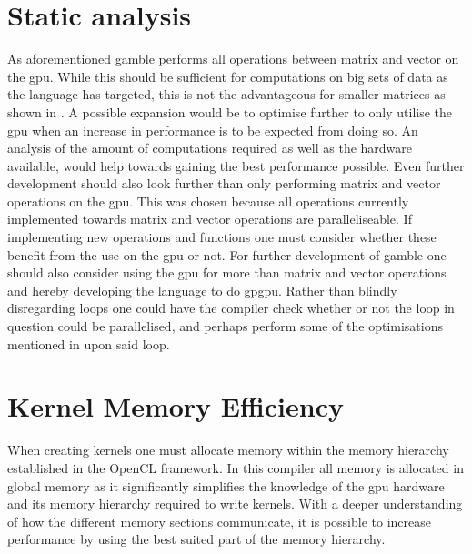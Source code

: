 \section{Static analysis}
As aforementioned \gls{gamble} performs all operations between matrix and vector on the \acrshort{gpu}.
While this should be sufficient for computations on big sets of data as the language has targeted, this is not the advantageous for smaller matrices as shown in .
A possible expansion would be to optimise further to only utilise the \acrshort{gpu} when an increase in performance is to be expected from doing so. 
An analysis of the amount of computations required as well as the hardware available, would help towards gaining the best performance possible.
Even further development should also look further than only performing matrix and vector operations on the \acrshort{gpu}.
This was chosen because all operations currently implemented towards matrix and vector operations are paralleliseable.
If implementing new operations and functions one must consider whether these benefit from the use on the \acrshort{gpu} or not.
For further development of \gls{gamble} one should also consider using the \acrshort{gpu} for more than matrix and vector operations and hereby developing the language to do \gls{gpgpu}. 
Rather than blindly disregarding loops one could have the compiler check whether or not the loop in question could be parallelised, and perhaps perform some of the optimisations mentioned in  upon said loop.
 
\section{Kernel Memory Efficiency}
When creating kernels one must allocate memory within the memory hierarchy established in the OpenCL framework. 
In this compiler all memory is allocated in global memory as it significantly simplifies the knowledge of the \acrshort{gpu} hardware and its memory hierarchy required to write kernels.
With a deeper understanding of how the different memory sections communicate, it is possible to increase performance by using the best suited part of the memory hierarchy. \citep{ocl_lecture3} 

